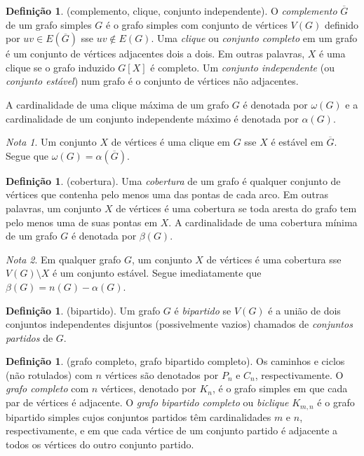 \documentclass{article}
\theoremstyle{plain}
\theoremstyle{definition}
\newtheorem{defn}[thm]{Definição}
\theoremstyle{remark}
\newtheorem*{rem}{Nota}
\begin{document}
\begin{defn} (complemento, clique, conjunto independente).
    O \emph{complemento} \(\overline{G}\) de um grafo simples \(G\) é o grafo simples com conjunto de vértices \(V(G)\) definido por \(uv \in E(\overline{G})\) sse \(uv \notin E(G)\).
    Uma \emph{clique} ou \emph{conjunto completo} em um grafo é um conjunto de vértices adjacentes dois a dois. Em outras palavras, \(X\) é uma clique se o grafo induzido \(G[X]\) é completo.
    Um \emph{conjunto independente} (ou \emph{conjunto estável}) num grafo é o conjunto de vértices não adjacentes.

    A cardinalidade de uma clique máxima de um grafo \(G\) é denotada por \(\omega(G)\) e a cardinalidade de um conjunto independente máximo é denotada por \(\alpha(G)\).
\end{defn}

\begin{rem}
    Um conjunto \(X\) de vértices é uma clique em \(G\) sse \(X\) é estável em \(\overline{G}\). Segue que \(\omega(G) = \alpha(\overline{G})\).
\end{rem}

\begin{defn} (cobertura).
    Uma \emph{cobertura} de um grafo é qualquer conjunto de vértices que contenha pelo menos uma das pontas de cada arco. Em outras palavras, um conjunto \(X\) de vértices é uma cobertura se toda aresta do grafo tem pelo menos uma de suas pontas em \(X\). A cardinalidade de uma cobertura mínima de um grafo \(G\) é denotada por \(\beta(G)\).
\end{defn}

\begin{rem}
    Em qualquer grafo \(G\), um conjunto \(X\) de vértices é uma cobertura sse \(V(G) \setminus X\) é um conjunto estável. Segue imediatamente que \(\beta(G) = n(G) - \alpha(G)\).
\end{rem}

\begin{defn} (bipartido).
    Um grafo \(G\) é \emph{bipartido} se \(V(G)\) é a união de dois conjuntos independentes disjuntos (possivelmente vazios) chamados de \emph{conjuntos partidos} de \(G\).
\end{defn}

\begin{defn} (grafo completo, grafo bipartido completo).
    Os caminhos e ciclos (não rotulados) com \(n\) vértices são denotados por \(P_n\) e \(C_n\), respectivamente. O \emph{grafo completo} com \(n\) vértices, denotado por \(K_n\), é o grafo simples em que cada par de vértices é adjacente. O \emph{grafo bipartido completo} ou \emph{biclique} \(K_{m,n}\) é o grafo bipartido simples cujos conjuntos partidos têm cardinalidades \(m\) e \(n\), respectivamente, e em que cada vértice de um conjunto partido é adjacente a todos os vértices do outro conjunto partido.
\end{defn}
\end{document}
